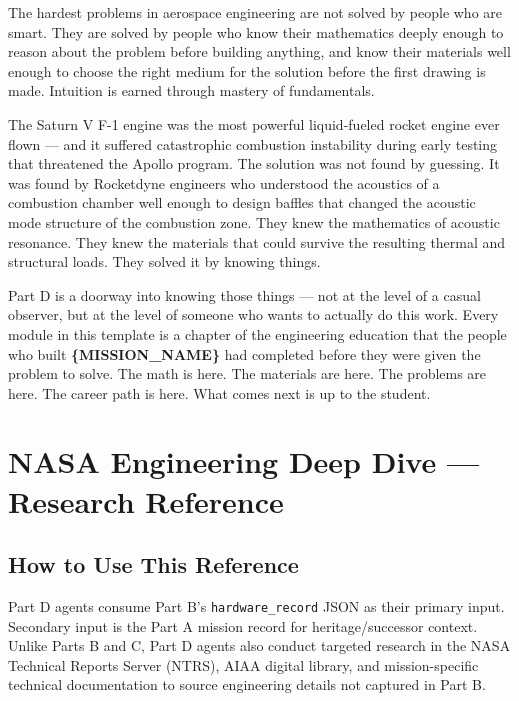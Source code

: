 \documentclass[11pt,letterpaper]{article}
\newcommand{\stageheader}[2]{%
  \noindent\colorbox{#2}{\makebox[\textwidth][l]{%
    \textcolor{white}{\bfseries\sffamily\hspace{6pt}#1\hspace{6pt}}}}%
  \vspace{0.5em}\par%
}
\newcommand{\param}[1]{\textcolor{paramred}{\textbf{\{#1\}}}}
\begin{document}
The hardest problems in aerospace engineering are not solved by people who are smart. They are solved by people who know their mathematics deeply enough to reason about the problem before building anything, and know their materials well enough to choose the right medium for the solution before the first drawing is made. Intuition is earned through mastery of fundamentals.

The Saturn V F-1 engine was the most powerful liquid-fueled rocket engine ever flown --- and it suffered catastrophic combustion instability during early testing that threatened the Apollo program. The solution was not found by guessing. It was found by Rocketdyne engineers who understood the acoustics of a combustion chamber well enough to design baffles that changed the acoustic mode structure of the combustion zone. They knew the mathematics of acoustic resonance. They knew the materials that could survive the resulting thermal and structural loads. They solved it by knowing things.

Part D is a doorway into knowing those things --- not at the level of a casual observer, but at the level of someone who wants to actually do this work. Every module in this template is a chapter of the engineering education that the people who built \param{MISSION\_NAME} had completed before they were given the problem to solve. The math is here. The materials are here. The problems are here. The career path is here. What comes next is up to the student.

\newpage

\stageheader{STAGE 2 --- RESEARCH REFERENCE}{secondary}

\section{NASA Engineering Deep Dive --- Research Reference}

\subsection{How to Use This Reference}

Part D agents consume Part B's \texttt{hardware\_record} JSON as their primary input. Secondary input is the Part A mission record for heritage/successor context. Unlike Parts B and C, Part D agents also conduct targeted research in the NASA Technical Reports Server (NTRS), AIAA digital library, and mission-specific technical documentation to source engineering details not captured in Part B.
\end{document}
